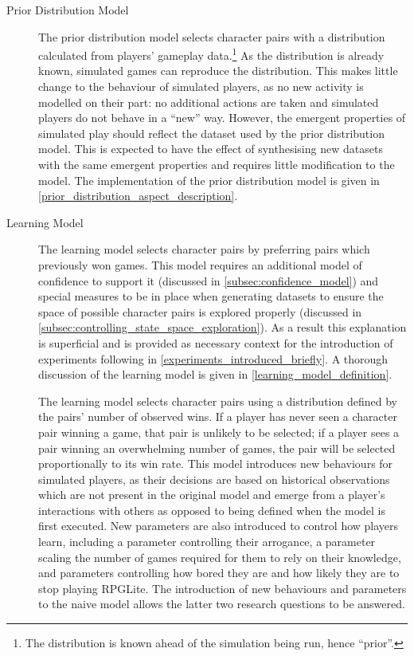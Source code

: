 \begin{description}
\item[Prior Distribution Model] The prior distribution model selects character
pairs with a distribution calculated from players' gameplay data.\footnote{The
distribution is known ahead of the simulation being run, hence ``prior''.} As
the distribution is already known, simulated games can reproduce the
distribution. This makes little change to the behaviour of simulated players, as
no new activity is modelled on their part: no additional actions are taken and
simulated players do not behave in a ``new'' way. However, the emergent
properties of simulated play should reflect the dataset used by the prior
distribution model. This is expected to have the effect of synthesising new
datasets with the same emergent properties and requires little modification to
the model. The implementation of the prior distribution model is given in
\cref{prior_distribution_aspect_description}.

\item[Learning Model] The learning model selects character pairs by preferring
pairs which previously won games. This model requires an additional model of
confidence to support it (discussed in \cref{subsec:confidence_model}) and
special measures to be in place when generating datasets to ensure the space of
possible character pairs is explored properly (discussed in
\cref{subsec:controlling_state_space_exploration}). As a result this explanation
is superficial and is provided as necessary context for the introduction of
experiments following in \cref{experiments_introduced_briefly}. A thorough
discussion of the learning model is given in \cref{learning_model_definition}.

The learning model selects character pairs using a distribution defined by the
pairs' number of observed wins. If a player has never seen a character pair
winning a game, that pair is unlikely to be selected; if a player sees a pair
winning an overwhelming number of games, the pair will be selected
proportionally to its win rate. This model introduces new behaviours for
simulated players, as their decisions are based on historical observations which
are not present in the original model and emerge from a player's interactions
with others as opposed to being defined when the model is first executed.
New parameters are also introduced to control how players learn, including a
parameter controlling their arrogance, a parameter scaling the number of games
required for them to rely on their knowledge, and parameters controlling how
bored they are and how likely they are to stop playing RPGLite. The introduction
of new behaviours and parameters to the naive model allows the latter two
research questions to be answered.

 
\end{description}



